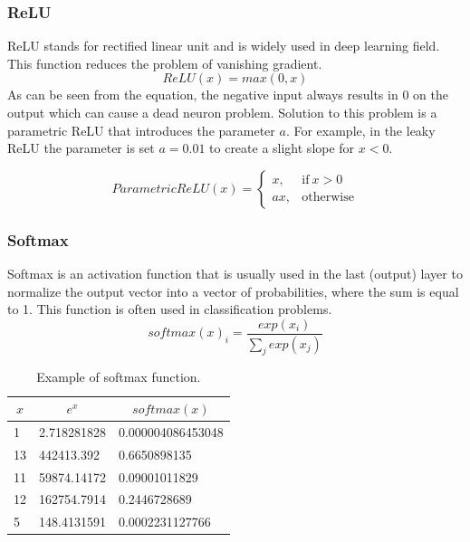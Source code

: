 \documentclass[thesis=M,english]{FITthesis}[2019/03/06]
\begin{document}
\subsubsection{ReLU}

ReLU stands for rectified linear unit and is widely used in deep learning field. This function reduces the problem of vanishing gradient.
$$
ReLU(x) = max(0,x)
$$
As can be seen from the equation, the negative input always results in 0 on the output which can cause a dead neuron problem. Solution to this problem is a parametric ReLU that introduces the parameter $a$. For example, in the leaky ReLU the parameter is set $a = 0.01$ to create a slight slope for $x < 0$.


 \begin{equation}
    Parametric ReLU(x) =
    \begin{cases}
      x, & \text{if}\ x > 0 \\
      ax, & \text{otherwise}
    \end{cases}
  \end{equation}
\subsubsection{Softmax}
Softmax is an activation function that is usually used in the last (output) layer to normalize the output vector into a vector of probabilities, where the sum is equal to 1. This function is often used in classification problems.
$$ softmax(x)_i = \frac{exp(x_i)}{\sum_{j}^{ }exp(x_j)} $$


\begin{table}[ht!]
\centering
\caption{Example of softmax function.}
\begin{tabular}{|l|l|l|}
\hline
\multicolumn{1}{|c|}{\textbf{$x$}} & \multicolumn{1}{c|}{\textbf{$e^x$}} & \multicolumn{1}{c|}{\textbf{$softmax(x)$}} \\ \hline
{\color[HTML]{000000} 1}             & {\color[HTML]{000000} 2.718281828}                     & {\color[HTML]{000000} 0.000004086453048}     \\ \hline
{\color[HTML]{000000} 13}            & {\color[HTML]{000000} 442413.392}                      & {\color[HTML]{000000} 0.6650898135}          \\ \hline
{\color[HTML]{000000} 11}            & {\color[HTML]{000000} 59874.14172}                     & {\color[HTML]{000000} 0.09001011829}         \\ \hline
{\color[HTML]{000000} 12}            & {\color[HTML]{000000} 162754.7914}                     & {\color[HTML]{000000} 0.2446728689}          \\ \hline
{\color[HTML]{000000} 5}             & {\color[HTML]{000000} 148.4131591}                     & {\color[HTML]{000000} 0.0002231127766}       \\ \hline
\end{tabular}
\end{table}
\end{document}
